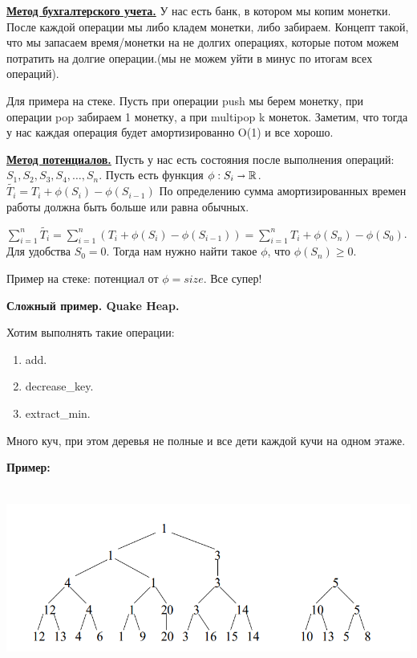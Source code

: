 \documentclass{article}
\newcommand{\deff}[1]{\underline{\textbf{#1}}}
\begin{document}
\deff{Метод бухгалтерского учета.} У нас есть банк, в котором мы копим монетки. После каждой операции мы либо кладем монетки, либо забираем. Концепт такой, что мы запасаем время/монетки на не долгих операциях, которые потом можем потратить на долгие операции.(мы не можем уйти в минус по итогам всех операций).

Для примера на стеке. Пусть при операции push мы берем монетку, при операции pop забираем 1 монетку, а при multipop k монеток. Заметим, что тогда  у нас каждая операция будет амортизированно O(1) и все хорошо.

\deff{Метод потенциалов.} Пусть у нас есть состояния после выполнения операций: $S_1,S_2,S_3,S_4,\ldots, S_n$. Пусть есть функция $\phi: S_i \shortrightarrow \mathbb{R}$. $\widetilde{T_i} = T_i + \phi(S_i)-\phi(S_{i-1})$ По определению сумма амортизированных времен работы должна быть больше  или равна  обычных.

$\sum\limits_{i=1}^n \widetilde{T_i} = \sum\limits_{i=1}^n  (T_i + \phi(S_i)-\phi(S_{i-1})) = \sum\limits_{i=1}^n T_i + \phi(S_n) -\phi(S_0)$. Для удобства $S_0=0$. Тогда нам нужно найти такое $\phi$, что $\phi(S_n)\geq0$. 

Пример на стеке: потенциал от $\phi = size$. Все супер!

\textbf{Сложный пример. Quake Heap.}

Хотим выполнять такие операции:
\begin{enumerate}
    \item add.
    \item decrease\_key.
    \item extract\_min.
\end{enumerate}

Много куч, при этом деревья не полные и все дети каждой кучи на одном этаже.

\textbf{Пример:}

 \includegraphics[width=18cm, height=6cm]{7.1.png}
\end{document}
